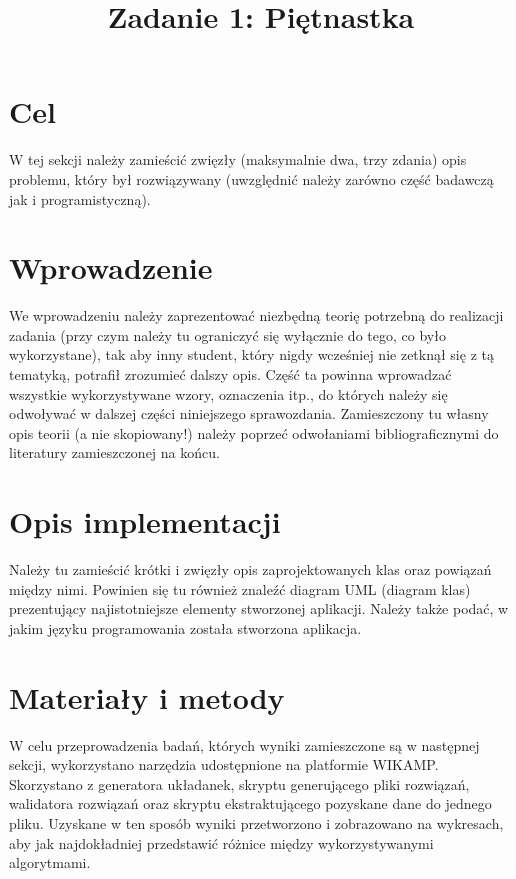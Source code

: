 \documentclass{classrep}
\author{
  \studentinfo{Paweł Guzek}{224304} \and
  \studentinfo{Krzysztof Szcześniak}{224434} \and
  \studentinfo{Michał Maksajda}{224369} \and
  \studentinfo{Dominik Kasierski}{224323}  
}
\title{Zadanie 1: Piętnastka}
\begin{document}
\maketitle
\pagebreak

\section{Cel}
{\color{blue}
W tej sekcji należy zamieścić zwięzły (maksymalnie dwa, trzy zdania) opis
problemu, który był rozwiązywany (uwzględnić należy zarówno część badawczą jak
i programistyczną).}

\section{Wprowadzenie}
{\color{blue}
We wprowadzeniu należy zaprezentować niezbędną teorię potrzebną do realizacji
zadania (przy czym należy tu ograniczyć się wyłącznie do tego, co było
wykorzystane), tak aby inny student, który nigdy wcześniej nie zetknął się z tą
tematyką, potrafił zrozumieć dalszy opis. Część ta powinna wprowadzać wszystkie
wykorzystywane wzory, oznaczenia itp., do których należy się odwoływać w
dalszej części niniejszego sprawozdania. Zamieszczony tu własny opis teorii (a
nie skopiowany!) należy poprzeć odwołaniami bibliograficznymi do literatury
zamieszczonej na końcu.}

\section{Opis implementacji}
{\color{blue}
Należy tu zamieścić krótki i zwięzły opis zaprojektowanych klas oraz powiązań
między nimi. Powinien się tu również znaleźć diagram UML (diagram klas)
prezentujący najistotniejsze elementy stworzonej aplikacji. Należy także podać,
w jakim języku programowania została stworzona aplikacja.}

\section{Materiały i metody}
{\color{black}
W celu przeprowadzenia badań, których wyniki zamieszczone są w następnej sekcji, wykorzystano narzędzia udostępnione na platformie WIKAMP. Skorzystano z generatora układanek, skryptu generującego pliki rozwiązań, walidatora rozwiązań oraz skryptu ekstraktującego pozyskane dane do jednego pliku. Uzyskane w ten sposób wyniki przetworzono i zobrazowano na wykresach, aby jak najdokładniej przedstawić różnice między wykorzystywanymi algorytmami.}
\end{document}
